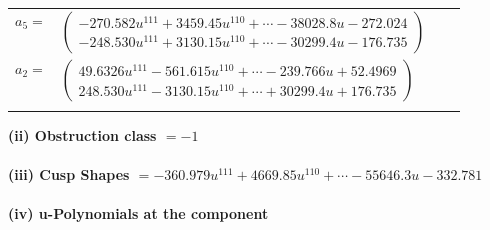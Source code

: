 \documentclass[1p]{elsarticle_modified}
\theoremstyle{definition}
\begin{document}
\begin{tabular}{m{7pt} m{180pt} m{7pt} m{180pt} }
\flushright $a_{5}=$&$\begin{pmatrix}-270.582 u^{111}+3459.45 u^{110}+\cdots-38028.8 u-272.024\\-248.530 u^{111}+3130.15 u^{110}+\cdots-30299.4 u-176.735\end{pmatrix}$ \\
\flushright $a_{2}=$&$\begin{pmatrix}49.6326 u^{111}-561.615 u^{110}+\cdots-239.766 u+52.4969\\248.530 u^{111}-3130.15 u^{110}+\cdots+30299.4 u+176.735\end{pmatrix}$\\&\end{tabular}
\flushleft \textbf{(ii) Obstruction class $= -1$}\\~\\
\flushleft \textbf{(iii) Cusp Shapes $= -360.979 u^{111}+4669.85 u^{110}+\cdots-55646.3 u-332.781$}\\~\\
\newpage\renewcommand{\arraystretch}{1}
\flushleft \textbf{(iv) u-Polynomials at the component}\newline \\
\end{document}
